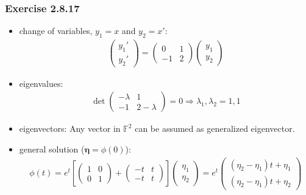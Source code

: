 \documentclass[12pt, letterpaper]{scrartcl}
\begin{document}
\subsubsection*{Exercise 2.8.17}
\begin{itemize}
    \item change of variables, $y_1=x$ and $y_2=x'$:
    \begin{align*}
        \left(\begin{array}{c}
        y_1' \\
        y_2' 
        \end{array}\right)=
        \left(\begin{array}{cc}
        0 & 1 \\
        -1 & 2 
        \end{array}\right)
        \left(\begin{array}{c}
        y_1 \\
        y_2 
        \end{array}\right)
    \end{align*}
    \item eigenvalues:
    \begin{align*}
        \det 
        \left(\begin{array}{cc}
        -\lambda & 1 \\
        -1 & 2-\lambda 
        \end{array}\right)=0
        \Longrightarrow
        \lambda_{1},\lambda_{2}=1, 1
    \end{align*}
    \item eigenvectors:
        Any vector in $\mathbb{F}^2$ can be assumed as generalized eigenvector.
    \item general solution (${\boldsymbol\eta}=\phi(0)$):
    \begin{align*}
        \phi(t)=
        e^{t}
        \left[
        \left(\begin{array}{cc}
        1 & 0 \\
        0 & 1 
        \end{array}\right)
        +
        \left(\begin{array}{cc}
        -t & t \\
        -t & t 
        \end{array}\right)
        \right]
        \left(\begin{array}{c}
            \eta_1\\
            \eta_2
        \end{array}\right)
        =
        e^t
        \left(\begin{array}{c}
            (\eta_2-\eta_1)t+\eta_1\\
            (\eta_2-\eta_1)t+\eta_2
        \end{array}\right)
    \end{align*}


\end{itemize}
\end{document}
